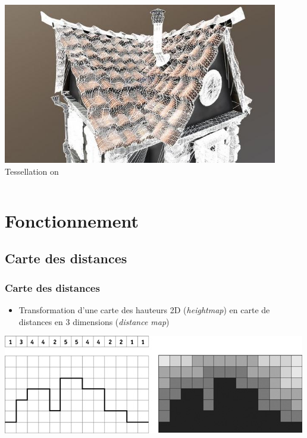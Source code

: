 \documentclass{beamer}
\begin{document}
\begin{frame}
\begin{columns}[t]
\begin{column}{0.5\textwidth}
            \includegraphics[width=0.9\textwidth]{images/tesselation_on_mesh}\\
            Tessellation on
        \end{column}
    \end{columns}
\end{frame}

\section{Fonctionnement}
\subsection{Carte des distances}
\begin{frame}
    \frametitle{Carte des distances}
    \begin{itemize}
        \item Transformation d'une carte des hauteurs 2D (\emph{heightmap}) en carte de distances en 3 dimensions (\emph{distance map})
    \end{itemize}
    \includegraphics[width=\textwidth]{images/sample_distancemap}
\end{frame}
\end{document}
